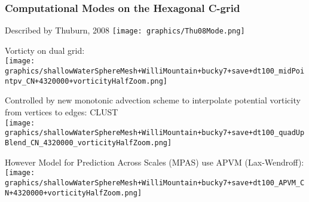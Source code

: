 \begin{frame}
\frametitle{Computational Modes on the Hexagonal C-grid}

\begin{minipage}{0.49\linewidth}\centering
Described by Thuburn, 2008
\texttt{[image: graphics/Thu08Mode.png]}
\pause
\end{minipage}
\begin{minipage}{0.49\linewidth}
Vorticty on dual grid:\\
\texttt{[image: graphics/shallowWaterSphereMesh+WilliMountain+bucky7+save+dt100\_midPointpv\_CN+4320000+vorticityHalfZoom.png]}
\pause
\end{minipage}
\begin{minipage}{0.49\linewidth}\raggedright\small
Controlled by new monotonic advection scheme to interpolate potential vorticity from vertices to edges: CLUST\\
\texttt{[image: graphics/shallowWaterSphereMesh+WilliMountain+bucky7+save+dt100\_quadUpBlend\_CN\_4320000\_vorticityHalfZoom.png]}
\pause
\end{minipage}
\begin{minipage}{0.49\linewidth}\centering\small
However Model for Prediction Across Scales (MPAS) use APVM (Lax-Wendroff):\\
\texttt{[image: graphics/shallowWaterSphereMesh+WilliMountain+bucky7+save+dt100\_APVM\_CN+4320000+vorticityHalfZoom.png]}
\end{minipage}

\end{frame}

